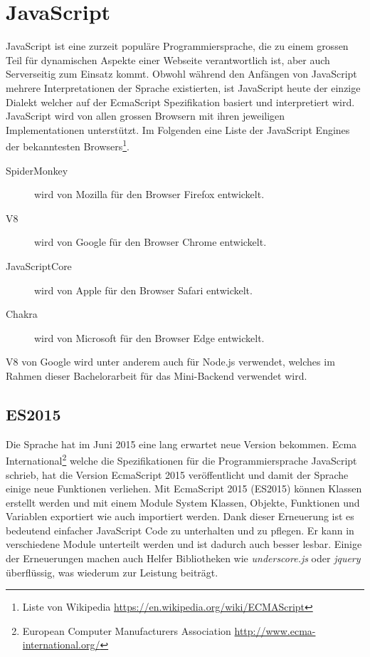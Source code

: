 \section{JavaScript}
JavaScript ist eine zurzeit populäre Programmiersprache, die zu einem grossen Teil für dynamischen Aspekte einer Webseite verantwortlich ist, aber auch Serverseitig zum Einsatz kommt. Obwohl während den Anfängen von JavaScript mehrere Interpretationen der Sprache existierten, ist JavaScript heute der einzige Dialekt welcher auf der EcmaScript Spezifikation basiert und interpretiert wird. JavaScript wird von allen grossen Browsern mit ihren jeweiligen Implementationen unterstützt. Im Folgenden eine Liste der JavaScript Engines der bekanntesten Browsers\footnote{Liste von Wikipedia \url{https://en.wikipedia.org/wiki/ECMAScript}}.
\begin{description}
	\item[SpiderMonkey] wird von Mozilla für den Browser Firefox entwickelt.
	\item[V8] wird von Google für den Browser Chrome entwickelt.
	\item[JavaScriptCore] wird von Apple für den Browser Safari entwickelt.
	\item[Chakra] wird von Microsoft für den Browser Edge entwickelt.
\end{description}
V8 von Google wird unter anderem auch für Node.js verwendet, welches im Rahmen dieser Bachelorarbeit für das Mini-Backend verwendet wird.

\subsection{ES2015}
Die Sprache hat im Juni 2015 eine lang erwartet neue Version bekommen. Ecma International\footnote{European Computer Manufacturers Association \url{http://www.ecma-international.org/}} welche die Spezifikationen für die Programmiersprache JavaScript schrieb, hat die Version EcmaScript 2015 veröffentlicht und damit der Sprache einige neue Funktionen verliehen. Mit EcmaScript 2015 (ES2015) können Klassen erstellt werden und mit einem Module System Klassen, Objekte, Funktionen und Variablen exportiert wie auch importiert werden. Dank dieser Erneuerung ist es bedeutend einfacher JavaScript Code zu unterhalten und zu pflegen. Er kann in verschiedene Module unterteilt werden und ist dadurch auch besser lesbar. Einige der Erneuerungen machen auch Helfer Bibliotheken wie \textit{underscore.js} oder \textit{jquery} überflüssig, was wiederum zur Leistung beiträgt.

